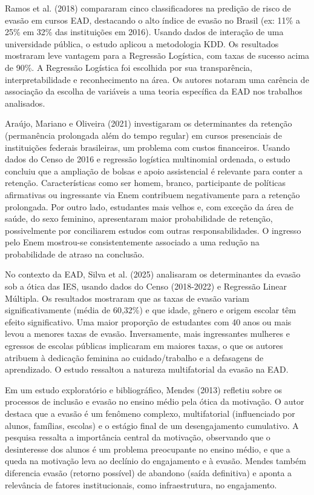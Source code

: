 \documentclass[english, spanish, brazilian]{RBIEarticle} %
\begin{document}
Ramos et al. (2018) compararam cinco classificadores na predição de risco de evasão em cursos EAD, destacando o alto índice de evasão no Brasil (ex: 11\% a 25\% em 32\% das instituições em 2016). Usando dados de interação de uma universidade pública, o estudo aplicou a metodologia KDD. Os resultados mostraram leve vantagem para a Regressão Logística, com taxas de sucesso acima de 90\%. A Regressão Logística foi escolhida por sua transparência, interpretabilidade e reconhecimento na área. Os autores notaram uma carência de associação da escolha de variáveis a uma teoria específica da EAD nos trabalhos analisados.

Araújo, Mariano e Oliveira (2021) investigaram os determinantes da retenção (permanência prolongada além do tempo regular) em cursos presenciais de instituições federais brasileiras, um problema com custos financeiros. Usando dados do Censo de 2016 e regressão logística multinomial ordenada, o estudo concluiu que a ampliação de bolsas e apoio assistencial é relevante para conter a retenção. Características como ser homem, branco, participante de políticas afirmativas ou ingressante via Enem contribuem negativamente para a retenção prolongada. Por outro lado, estudantes mais velhos e, com exceção da área de saúde, do sexo feminino, apresentaram maior probabilidade de retenção, possivelmente por conciliarem estudos com outras responsabilidades. O ingresso pelo Enem mostrou-se consistentemente associado a uma redução na probabilidade de atraso na conclusão.

No contexto da EAD, Silva et al. (2025) analisaram os determinantes da evasão sob a ótica das IES, usando dados do Censo (2018-2022) e Regressão Linear Múltipla. Os resultados mostraram que as taxas de evasão variam significativamente (média de 60,32\%) e que idade, gênero e origem escolar têm efeito significativo. Uma maior proporção de estudantes com 40 anos ou mais levou a menores taxas de evasão. Inversamente, mais ingressantes mulheres e egressos de escolas públicas implicaram em maiores taxas, o que os autores atribuem à dedicação feminina ao cuidado/trabalho e a defasagens de aprendizado. O estudo ressaltou a natureza multifatorial da evasão na EAD.

Em um estudo exploratório e bibliográfico, Mendes (2013) refletiu sobre os processos de inclusão e evasão no ensino médio pela ótica da motivação. O autor destaca que a evasão é um fenômeno complexo, multifatorial (influenciado por alunos, famílias, escolas) e o estágio final de um desengajamento cumulativo. A pesquisa ressalta a importância central da motivação, observando que o desinteresse dos alunos é um problema preocupante no ensino médio, e que a queda na motivação leva ao declínio do engajamento e à evasão. Mendes também diferencia evasão (retorno possível) de abandono (saída definitiva) e aponta a relevância de fatores institucionais, como infraestrutura, no engajamento.
\end{document}
